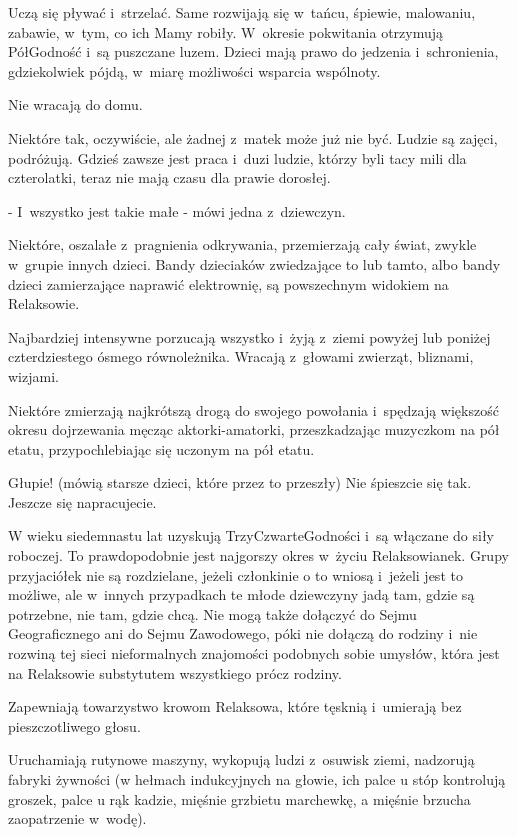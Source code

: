 \documentclass[oneside,polish,12pt,sfheadings]{mwbk}
\begin{document}
Uczą się pływać i~strzelać. Same rozwijają się w~tańcu, śpiewie, malowaniu,
zabawie, w~tym, co ich Mamy robiły. W~okresie pokwitania otrzymują
PółGodność i~są puszczane luzem. Dzieci mają prawo do jedzenia i~schronienia,
gdziekolwiek pójdą, w~miarę możliwości wsparcia wspólnoty.

Nie wracają do domu.

Niektóre tak, oczywiście, ale żadnej z~matek może już nie być. Ludzie
są zajęci, podróżują. Gdzieś zawsze jest praca i~duzi ludzie, którzy
byli tacy mili dla czterolatki, teraz nie mają czasu dla prawie dorosłej.

- I~wszystko jest takie małe - mówi jedna z~dziewczyn.

Niektóre, oszalałe z~pragnienia odkrywania, przemierzają cały świat,
zwykle w~grupie innych dzieci. Bandy dzieciaków zwiedzające to lub
tamto, albo bandy dzieci zamierzające naprawić elektrownię, są powszechnym
widokiem na Relaksowie.

Najbardziej intensywne porzucają wszystko i~żyją z~ziemi powyżej lub
poniżej czterdziestego ósmego równoleżnika. Wracają z~głowami zwierząt,
bliznami, wizjami.

Niektóre zmierzają najkrótszą drogą do swojego powołania i~spędzają
większość okresu dojrzewania męcząc aktorki-amatorki, przeszkadzając
muzyczkom na pół etatu, przypochlebiając się uczonym na pół etatu.

Głupie! (mówią starsze dzieci, które przez to przeszły) Nie śpieszcie
się tak. Jeszcze się napracujecie.

W wieku siedemnastu lat uzyskują TrzyCzwarteGodności i~są włączane
do siły roboczej. To prawdopodobnie jest najgorszy okres w~życiu
Relaksowianek. Grupy przyjaciółek nie są rozdzielane, jeżeli członkinie
o to wniosą i~jeżeli jest to możliwe, ale w~innych przypadkach te
młode dziewczyny jadą tam, gdzie są potrzebne, nie tam, gdzie chcą.
Nie mogą także dołączyć do Sejmu Geograficznego ani do Sejmu Zawodowego,
póki nie dołączą do rodziny i~nie rozwiną tej sieci nieformalnych
znajomości podobnych sobie umysłów, która jest na Relaksowie substytutem
wszystkiego prócz rodziny.

Zapewniają towarzystwo krowom Relaksowa, które tęsknią i~umierają
bez pieszczotliwego głosu.

Uruchamiają rutynowe maszyny, wykopują ludzi z~osuwisk ziemi, nadzorują
fabryki żywności (w hełmach indukcyjnych na głowie, ich palce u stóp
kontrolują groszek, palce u rąk kadzie, mięśnie grzbietu marchewkę,
a mięśnie brzucha zaopatrzenie w~wodę).
\end{document}
